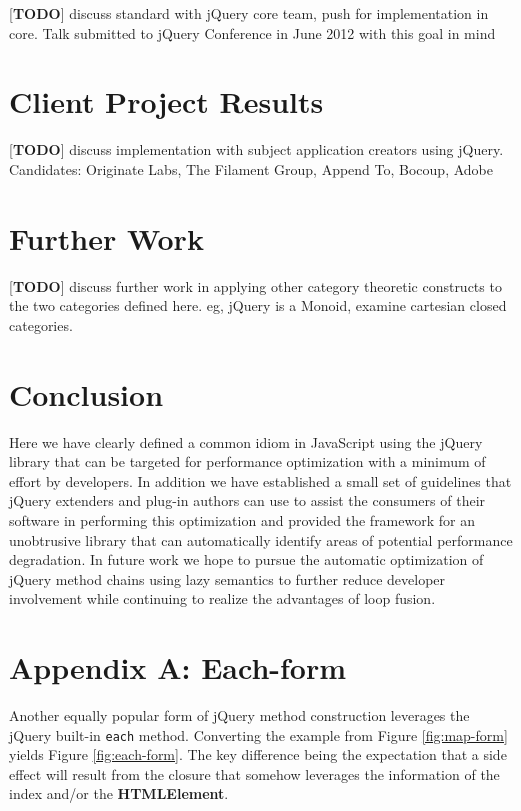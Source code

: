 \documentclass[preprint]{sigplanconf}
\begin{document}
[\textbf{TODO}] discuss standard with jQuery core team, push for implementation in core. Talk submitted to jQuery Conference in June 2012 with this goal in mind

\section{Client Project Results}

[\textbf{TODO}] discuss implementation with subject application creators using jQuery. Candidates: Originate Labs, The Filament Group, Append To, Bocoup, Adobe

\section{Further Work}

[\textbf{TODO}] discuss further work in applying other category theoretic constructs to the two categories defined here. eg, jQuery is a Monoid, examine cartesian closed categories.

\section{Conclusion}

Here we have clearly defined a common idiom in JavaScript using the jQuery library that can be targeted for performance optimization with a minimum of effort by developers. In addition we have established a small set of guidelines that jQuery extenders and plug-in authors can use to assist the consumers of their software in performing this optimization and provided the framework for an unobtrusive library that can automatically identify areas of potential performance degradation. In future work we hope to pursue the automatic optimization of jQuery method chains using lazy semantics to further reduce developer involvement while continuing to realize the advantages of loop fusion.

\appendix
\section{Appendix A: Each-form}

Another equally popular form of jQuery method construction leverages the jQuery built-in \verb|each| method. Converting the example from Figure \ref{fig:map-form} yields Figure \ref{fig:each-form}. The key difference being the expectation that a side effect will result from the closure that somehow leverages the information of the index and/or the \textbf{HTMLElement}.
\end{document}

